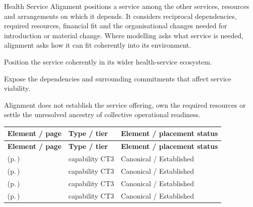 Health Service Alignment positions a service among the other services, resources and arrangements on which it depends. It considers reciprocal dependencies, required resources, financial fit and the organisational changes needed for introduction or material change. Where modelling asks what service is needed, alignment asks how it can fit coherently into its environment.



Position the service coherently in its wider health-service ecosystem.



Expose the dependencies and surrounding commitments that affect service viability.



Alignment does not establish the service offering, own the required resources or settle the unresolved ancestry of collective operational readiness.


\begingroup\small\setlength{\TableWidth}{\dimexpr\linewidth-6\tabcolsep-4\arrayrulewidth\relax}
\begin{longtable}{|>{\raggedright\arraybackslash}p{0.52\TableWidth}|>{\raggedright\arraybackslash}p{0.2\TableWidth}|>{\raggedright\arraybackslash}p{0.28\TableWidth}|}
\hline\rowcolor{TableHead}\textbf{Element / page} & \textbf{Type / tier} & \textbf{Element / placement status}\\\hline\endfirsthead
\hline\rowcolor{TableHead}\textbf{Element / page} & \textbf{Type / tier} & \textbf{Element / placement status}\\\hline\endhead
\hline\endfoot
\nameref{cap:bc-health-service-co-dependency-management} (p.\,\pageref{cap:bc-health-service-co-dependency-management}) & capability CT3 & Canonical / Established\\\hline
\nameref{cap:bc-health-service-resource-identification} (p.\,\pageref{cap:bc-health-service-resource-identification}) & capability CT3 & Canonical / Established\\\hline
\nameref{cap:bc-health-service-financial-management} (p.\,\pageref{cap:bc-health-service-financial-management}) & capability CT3 & Canonical / Established\\\hline
\nameref{cap:bc-health-service-implementation-planning} (p.\,\pageref{cap:bc-health-service-implementation-planning}) & capability CT3 & Canonical / Established\\\hline
\end{longtable}\endgroup

